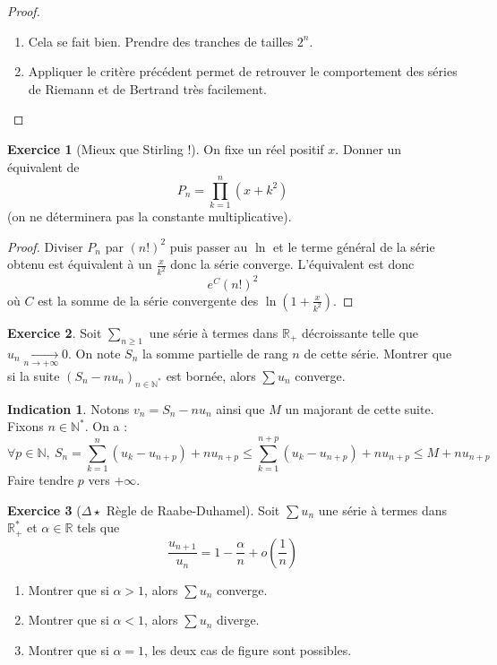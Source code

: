 \documentclass[french]{book}
\newcommand{\N}{\mathbb{N}}
\newcommand{\R}{\mathbb{R}}
\newcommand{\st}{^*}
\theoremstyle{definition}
\newtheorem{ex}{Exercice}[chapter]
\theoremstyle{theorem}
\newtheorem*{ind}{Indication}
\theoremstyle{remark}
\begin{document}
\begin{proof}
	\begin{enumerate}
		\item Cela se fait bien. Prendre des tranches de tailles $2^n$.
		\item Appliquer le critère précédent permet de retrouver le comportement des séries de Riemann et de Bertrand très facilement.
	\end{enumerate}
\end{proof}

\begin{ex}[Mieux que Stirling !]
	On fixe un réel positif $x$. Donner un équivalent de $$P_n=\prod_{k=1}^{n}(x+k^2)$$ (on ne déterminera pas la constante multiplicative).
\end{ex}

\begin{proof}
	Diviser $P_n$ par $(n!)^2$ puis passer au $\ln$ et le terme général de la série obtenu est équivalent à un $\displaystyle\frac{x}{k^2}$ donc la série converge. L'équivalent est donc $$e^{C}(n!)^2$$ où $C$ est la somme de la série convergente des $\ln\left(1+\frac{x}{k^2}\right)$.
\end{proof}

\begin{ex}
	Soit $\displaystyle\sum_{n\geqslant 1}$ une série à termes dans $\R_+$ décroissante telle que $u_n\xrightarrow[n\to+\infty]{}0$. On note $S_n$ la somme partielle de rang $n$ de cette série. Montrer que si la suite $(S_n-nu_n)_{n\in\N\st}$ est bornée, alors $\displaystyle\sum u_n$ converge.
\end{ex}

\begin{ind}
	Notons $v_n=S_n-nu_n$ ainsi que $M$ un majorant de cette suite. Fixons $n\in\N\st$. On a : $$\forall p\in\N,\ S_n=\sum_{k=1}^{n}(u_k-u_{n+p})+nu_{n+p}\leqslant \sum_{k=1}^{n+p}(u_k-u_{n+p})+nu_{n+p}\leqslant M+nu_{n+p}$$ Faire tendre $p$ vers $+\infty$.
\end{ind}

\begin{ex}[$\Delta\star$ Règle de Raabe-Duhamel]
	Soit $\sum u_n$ une série à termes dans $\R_+\st$ et $\alpha\in\R$ tels que $$\frac{u_{n+1}}{u_n}=1-\frac{\alpha}{n}+o\left(\frac{1}{n}\right)$$
	\begin{enumerate}
		\item Montrer que si $\alpha>1$, alors $\displaystyle\sum u_n$ converge.
		\item Montrer que si $\alpha<1$, alors $\displaystyle\sum u_n$ diverge.
		\item Montrer que si $\alpha=1$, les deux cas de figure sont possibles.
	\end{enumerate}
\end{ex}
\end{document}
